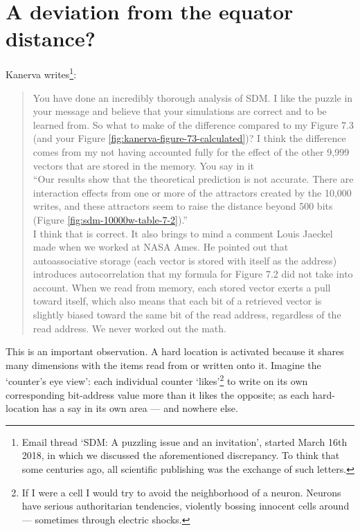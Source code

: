 
\section{A deviation from the equator distance?}

Kanerva writes\footnote{Email thread `SDM: A puzzling issue and an invitation', started March 16th 2018, in which we discussed the aforementioned discrepancy.  To think that some centuries ago, all scientific publishing was the exchange of such letters.}:

\begin{quote}
    You have done an incredibly thorough analysis of SDM. I like the puzzle in your message and believe that your simulations are correct and to be learned from.  So what to make of the difference compared to my Figure 7.3 (and your Figure \ref{fig:kanerva-figure-73-calculated})?  I think the difference comes from my not having accounted fully for the effect of the other 9,999 vectors that are stored in the memory.  You say in it\\

   ``Our results show that the theoretical prediction is not accurate. There are interaction effects from one or more of the attractors created by the 10,000 writes, and these attractors seem to raise the distance beyond 500 bits (Figure \ref{fig:sdm-10000w-table-7-2}).'' \\

   I think that is correct.  It also brings to mind a comment Louis Jaeckel made when we worked at NASA Ames.  He pointed out that autoassociative storage (each vector is stored with itself as the address) introduces autocorrelation that my formula for Figure 7.2 did not take into account.  When we read from memory, each stored vector exerts a pull toward itself, which also means that each bit of a retrieved vector is slightly biased toward the same bit of the read address, regardless of the read address.  We never worked out the math.
\end{quote}

This is an important observation. A hard location is activated because it shares many dimensions with the items read from or written onto it. Imagine the `counter's eye view':  each individual counter `likes'\footnote{If I were a cell I would try to avoid the neighborhood of a neuron. Neurons have serious authoritarian tendencies, violently bossing innocent cells around --- sometimes through electric shocks.} to write on its own corresponding bit-address value more than it likes the opposite; as each hard-location has a say in its own area --- and nowhere else.

